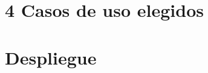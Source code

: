 \subsection{}

\subsection{}

\subsection{}

\section{4 Casos de uso elegidos}


\section{Despliegue}


